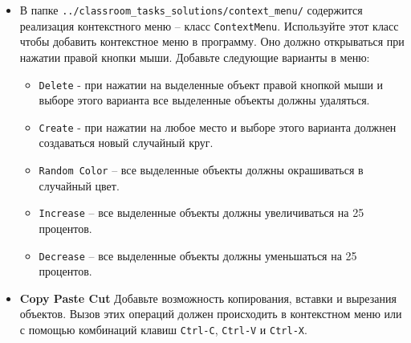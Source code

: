 \documentclass{article}
\begin{document}
\begin{itemize}
\item В папке \texttt{../classroom\_tasks\_solutions/context\_menu/} содержится реализация контекстного меню -- класс \texttt{ContextMenu}. Используйте этот класс чтобы добавить контекстное меню в программу. Оно должно открываться при нажатии правой кнопки мыши. Добавьте следующие варианты в меню:
\begin{itemize}
\item \texttt{Delete} - при нажатии на выделенные объект правой кнопкой мыши и выборе этого варианта все выделенные объекты должны удаляться.
\item \texttt{Create} - при нажатии на любое место и выборе этого варианта должнен создаваться новый случайный круг.
\item \texttt{Random Color} -- все выделенные объекты должны окрашиваться в случайный цвет.
\item \texttt{Increase} -- все выделенные объекты должны увеличиваться на 25 процентов.
\item \texttt{Decrease} -- все выделенные объекты должны уменьшаться на 25 процентов.
\end{itemize}

\item \textbf{Copy Paste Cut} Добавьте возможность копирования, вставки и вырезания объектов. Вызов этих операций должен происходить в контекстном меню или с помощью комбинаций клавиш \texttt{Ctrl-C}, \texttt{Ctrl-V} и \texttt{Ctrl-X}.

\end{itemize}
\end{document}

